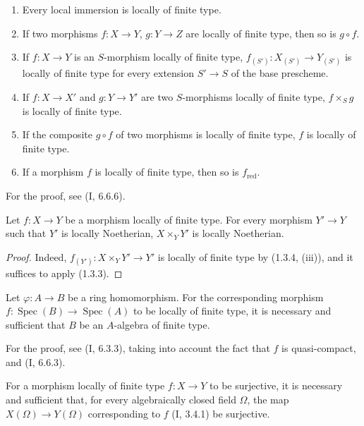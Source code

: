\begin{proposition}[1.3.4]
\label{IV.1.3.4}
\begin{enumerate}
  \item[(i)] Every local immersion is locally of finite type.
  \item[(ii)] If two morphisms $f:X\to Y$, $g:Y\to Z$ are locally of
  finite type, then so is $g\circ f$.
  \item[(iii)] If $f:X\to Y$ is an $S$-morphism locally of finite type,
  $f_{(S')}:X_{(S')}\to Y_{(S')}$ is locally of finite type for every
  extension $S'\to S$ of the base prescheme.
  \item[(iv)] If $f:X\to X'$ and $g:Y\to Y'$ are two $S$-morphisms
  locally of finite type, $f\times_Sg$ is locally of finite type.
  \item[(v)] If the composite $g\circ f$ of two morphisms is locally of
  finite type, $f$ is locally of finite type.
  \item[(vi)] If a morphism $f$ is locally of finite type, then so is
  $f_{\mathrm{red}}$.
\end{enumerate}
\end{proposition}

For the proof, see (I, 6.6.6).

\begin{corollary}[1.3.5]
\label{IV.1.3.5}
Let $f:X\to Y$ be a morphism locally of finite type. For every morphism
$Y'\to Y$ such that $Y'$ is locally Noetherian, $X\times_YY'$ is
locally Noetherian.
\end{corollary}

\begin{proof}
Indeed, $f_{(Y')}:X\times_YY'\to Y'$ is locally of finite type by
(1.3.4, (iii)), and it suffices to apply (1.3.3).
\end{proof}

\begin{proposition}[1.3.6]
\label{IV.1.3.6}
Let $\varphi:A\to B$ be a ring homomorphism. For the corresponding
morphism $f:\operatorname{Spec}(B)\to\operatorname{Spec}(A)$ to be locally of finite type, it is necessary and
sufficient that $B$ be an $A$-algebra of finite type.
\end{proposition}

For the proof, see (I, 6.3.3), taking into account the fact that $f$ is
quasi-compact, and (I, 6.6.3).

\begin{proposition}[1.3.7]
\label{IV.1.3.7}
For a morphism locally of finite type $f:X\to Y$ to be surjective, it is
necessary and sufficient that, for every algebraically closed field $\Omega$,
the map $X(\Omega)\to Y(\Omega)$ corresponding to $f$ (I, 3.4.1) be
surjective.
\end{proposition}

